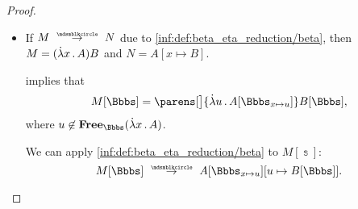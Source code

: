 \begin{proof}
\begin{itemize}
    By assumption, \( u \) is not in \( \op*{Free}_\Bbbs(M) \), hence it belongs to \( \op*{Free}_\Bbbs(A) \) only if it is free in \( \Bbbs(x) \). The generalized condition in \cref{thm:substitution_chain_contraction/composition} is satisfied, so we conclude that
    \begin{equation*}
      A[\Bbbs_{x \mapsto u}][u \mapsto v] \aequiv A[\Bbbs_{x \mapsto v}].
    \end{equation*}

    Therefore,
    \begin{equation}\label{eq:thm:substitution_on_single_step_reduction/proof/abs/alpha}
      M[\Bbbs] \aequiv \qabs v A[\Bbbs_{x \mapsto v}].
    \end{equation}

    The inductive hypothesis implies that
    \begin{equation*}
      A[\Bbbs_{x \mapsto v}] \pred B[\Bbbs_{x \mapsto v}],
    \end{equation*}
    hence, we can apply \ref{inf:def:lambda_term_reduction/abs} to conclude that
    \begin{equation}\label{eq:thm:substitution_on_single_step_reduction/proof/abs/hyp}
      \qabs v A[\Bbbs_{x \mapsto v}] \pred \qabs v B[\Bbbs_{x \mapsto v}].
    \end{equation}

    Finally, by noting \eqref{eq:thm:substitution_on_single_step_reduction/proof/abs/alpha}, we can apply \ref{inf:def:lambda_term_reduction/alpha} to conclude that
    \begin{equation*}
      M[\Bbbs]
      =
      \qabs u A[\Bbbs_{x \mapsto u}]
      \pred
      \qabs v B[\Bbbs_{x \mapsto v}]
      =
      N[\Bbbs].
    \end{equation*}

    \item If \( M \pred N \) due to \ref{inf:def:beta_eta_reduction/beta}, then \( M = (\qabs x A)B \) and \( N = A[x \mapsto B] \).

     implies that
    \begin{equation*}
      M[\Bbbs] = \parens[\big]{ \qabs u A[\Bbbs_{x \mapsto u}] } B[\Bbbs],
    \end{equation*}
    where \( u \not\in \op*{Free}_\Bbbs(\qabs x A) \).

    We can apply \ref{inf:def:beta_eta_reduction/beta} to \( M[\Bbbs] \):
    \begin{equation*}
      M[\Bbbs]
      \pred
      A[\Bbbs_{x \mapsto u}][u \mapsto B[\Bbbs]].
    \end{equation*}


\end{itemize}
\end{proof}
